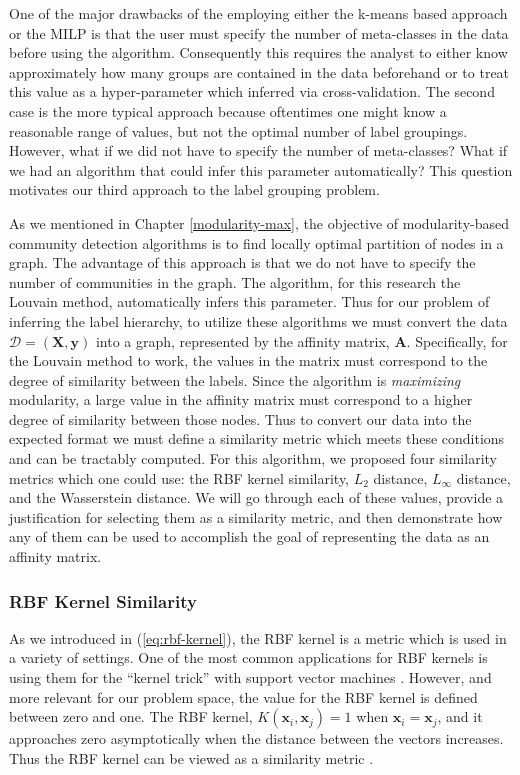 \documentclass[../thesis.tex]{subfiles}
\begin{document}
One of the major drawbacks of the employing either the k-means based approach or the MILP is that the user must specify the number of meta-classes in the data before using the algorithm. Consequently this requires the analyst to either know approximately how many groups are contained in the data beforehand or to treat this value as a hyper-parameter which inferred via cross-validation. The second case is the more typical approach because oftentimes one might know a reasonable range of values, but not the optimal number of label groupings. However, what if we did not have to specify the number of meta-classes? What if we had an algorithm that could infer this parameter automatically? This question motivates our third approach to the label grouping problem.

As we mentioned in Chapter \ref{modularity-max}, the objective of modularity-based community detection algorithms is to find locally optimal partition of nodes in a graph. The advantage of this approach is that we do not have to specify the number of communities in the graph. The algorithm, for this research the Louvain method, automatically infers this parameter. Thus for our problem of inferring the label hierarchy, to utilize these algorithms we must convert the data $\mathcal{D} = (\mathbf{X}, \mathbf{y})$ into a graph, represented by the affinity matrix, $\mathbf{A}$. Specifically, for the Louvain method to work, the values in the matrix must correspond to the degree of similarity between the labels. Since the algorithm is \textit{maximizing} modularity, a large value in the affinity matrix must correspond to a higher degree of similarity between those nodes. Thus to convert our data into the expected format we must define a similarity metric which meets these conditions and can be tractably computed. For this algorithm, we proposed four similarity metrics which one could use: the RBF kernel similarity, $L_2$ distance, $L_\infty$ distance, and the Wasserstein distance. We will go through each of these values, provide a justification for selecting them as a similarity metric, and then demonstrate how any of them can be used to accomplish the goal of representing the data as an affinity matrix.

\subsubsection{RBF Kernel Similarity}
As we introduced in (\ref{eq:rbf-kernel}), the RBF kernel is a metric which is used in a variety of settings. One of the most common applications for RBF kernels is using them for the ``kernel trick'' with support vector machines \cite{rahimi2008random}. However, and more relevant for our problem space, the value for the RBF kernel is defined between zero and one. The RBF kernel, $K(\mathbf{x}_i, \mathbf{x}_j) = 1$ when $\mathbf{x}_i = \mathbf{x}_j$, and it approaches zero asymptotically when the distance between the vectors increases. Thus the RBF kernel can be viewed as a similarity metric \cite{vert2004primer}.
\end{document}
